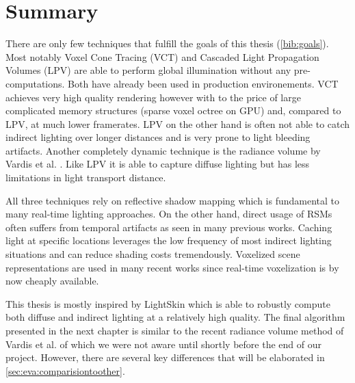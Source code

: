 \documentclass[thesis.tex]{subfiles}
\begin{document}
\section{Summary} 
There are only few techniques that fulfill the goals of this thesis (\autoref{bib:goals}).
Most notably Voxel Cone Tracing \cite{bib:voxelgi} (VCT) and Cascaded Light Propagation Volumes \cite{bib:lpt} (LPV) are able to perform global illumination without any pre-computations.
Both have already been used in production environements. 
VCT achieves very high quality rendering however with to the price of large complicated memory structures (sparse voxel octree on GPU) and, compared to LPV, at much lower framerates.
LPV on the other hand is often not able to catch indirect lighting over longer distances and is very prone to light bleeding artifacts.
Another completely dynamic technique is the radiance volume by Vardis et al. \cite{bib:radiancecachechromaticcompression}.
Like LPV it is able to capture diffuse lighting but has less limitations in light transport distance.

All three techniques rely on reflective shadow mapping which is fundamental to many real-time lighting approaches.
On the other hand, direct usage of RSMs often suffers from temporal artifacts as seen in many previous works.
Caching light at specific locations leverages the low frequency of most indirect lighting situations and can reduce shading costs tremendously.
Voxelized scene representations are used in many recent works since real-time voxelization is by now cheaply available.

This thesis is mostly inspired by LightSkin \cite{bib:LightskinPaper} which is able to robustly compute both diffuse and indirect lighting at a relatively high quality.
The final algorithm presented in the next chapter is similar to the recent radiance volume method of Vardis et al. \cite{bib:radiancecachechromaticcompression} of which we were not aware until shortly before the end of our project.
However, there are several key differences that will be elaborated in \autoref{sec:eva:comparisiontoother}.


\subfilebib %
\end{document}
